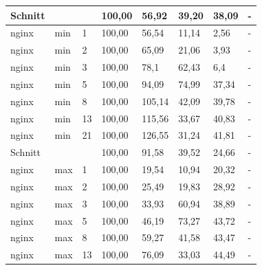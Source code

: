 \begin{footnotesize}
\begin{longtable}{llllllll}
		Schnitt        &         &            & 100,00 & 56,92                       & 39,20                          & 38,09  & -      \\ \hline
		nginx          & min     & 1          & 100,00 & 56,54                       & 11,14                          & 2,56   & -      \\
		nginx          & min     & 2          & 100,00 & 65,09                       & 21,06                          & 3,93   & -      \\
		nginx          & min     & 3          & 100,00 & 78,1                        & 62,43                          & 6,4    & -      \\
		nginx          & min     & 5          & 100,00 & 94,09                       & 74,99                          & 37,34  & -      \\
		nginx          & min     & 8          & 100,00 & 105,14                      & 42,09                          & 39,78  & -      \\
		nginx          & min     & 13         & 100,00 & 115,56                      & 33,67                          & 40,83  & -      \\
		nginx          & min     & 21         & 100,00 & 126,55                      & 31,24                          & 41,81  & -      \\ \hline
		Schnitt        &         &            & 100,00 & 91,58                       & 39,52                          & 24,66  & -      \\ \hline
		nginx          & max     & 1          & 100,00 & 19,54                       & 10,94                          & 20,32  & -      \\
		nginx          & max     & 2          & 100,00 & 25,49                       & 19,83                          & 28,92  & -      \\
		nginx          & max     & 3          & 100,00 & 33,93                       & 60,94                          & 38,89  & -      \\
		nginx          & max     & 5          & 100,00 & 46,19                       & 73,27                          & 43,72  & -      \\
		nginx          & max     & 8          & 100,00 & 59,27                       & 41,58                          & 43,47  & -      \\
		nginx          & max     & 13         & 100,00 & 76,09                       & 33,03                          & 44,49  & -      \\

\end{longtable}
\end{footnotesize}
